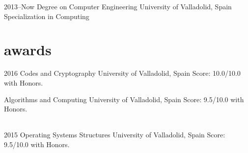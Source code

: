 \documentclass[]{friggeri-cv} %
\begin{document}
\begin{entrylist}


\entry
{2013--Now}
{Degree {\normalfont on Computer Engineering} }
{University of Valladolid, Spain}
{Specialization in Computing}



\end{entrylist}



\section{awards}

\begin{entrylist}


\entry
{2016}
{Codes and Cryptography}
{University of Valladolid, Spain}
{Score: 10.0/10.0 with Honors.}

\entry
{}
{Algorithms and Computing}
{University of Valladolid, Spain}
{Score: 9.5/10.0 with Honors.} 

\\
\entry
{2015}
{Operating Systems Structures}
{University of Valladolid, Spain}
{Score: 9.5/10.0 with Honors.}


\end{entrylist}

\end{document}
